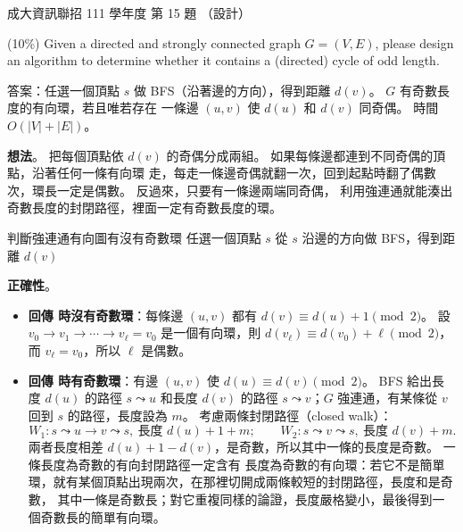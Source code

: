 \begin{pastexam}[label={px:ncku-111-prog-15}]{成大資訊聯招 111 學年度 第 15 題}
（設計）

(10\%) Given a directed and strongly connected graph $G=(V,E)$, please design an algorithm to determine whether it contains a (directed) cycle of odd length.
\end{pastexam}

\begin{pastsoln}
答案：任選一個頂點 $s$ 做 BFS（沿著邊的方向），得到距離 $d(v)$。 $G$ 有奇數長度的有向環，若且唯若存在
一條邊 $(u, v)$ 使 $d(u)$ 和 $d(v)$ 同奇偶。 時間 $O(|V| + |E|)$。

\textbf{想法}。 把每個頂點依 $d(v)$ 的奇偶分成兩組。 如果每條邊都連到不同奇偶的頂點，沿著任何一條有向環
走，每走一條邊奇偶就翻一次，回到起點時翻了偶數次，環長一定是偶數。 反過來，只要有一條邊兩端同奇偶，
利用強連通就能湊出奇數長度的封閉路徑，裡面一定有奇數長度的環。

\begin{pseudo}{判斷強連通有向圖有沒有奇數環}
    \State 任選一個頂點 $s$
    \State 從 $s$ 沿邊的方向做 BFS，得到距離 $d(v)$ 
            \State \Return \TRUE
        \EndIf
    \EndFor
    \State \Return \FALSE
\EndFunction
\end{pseudo}

\textbf{正確性}。
\begin{itemize}
\item \textbf{回傳 \FALSE 時沒有奇數環}：每條邊 $(u, v)$ 都有 $d(v) \equiv d(u) + 1 \pmod 2$。 設
$v_0 \to v_1 \to \cdots \to v_{\ell} = v_0$ 是一個有向環，則 $d(v_\ell) \equiv d(v_0) + \ell \pmod 2$，而
$v_\ell = v_0$，所以 $\ell$ 是偶數。
\item \textbf{回傳 \TRUE 時有奇數環}：有邊 $(u, v)$ 使 $d(u) \equiv d(v) \pmod 2$。 BFS 給出長度 $d(u)$ 的路徑
$s \leadsto u$ 和長度 $d(v)$ 的路徑 $s \leadsto v$；$G$ 強連通，有某條從 $v$ 回到 $s$ 的路徑，長度設為 $m$。
考慮兩條封閉路徑（closed walk）：
\[
W_1 : s \leadsto u \to v \leadsto s,\ \text{長度 } d(u) + 1 + m; \qquad
W_2 : s \leadsto v \leadsto s,\ \text{長度 } d(v) + m .
\]
兩者長度相差 $d(u) + 1 - d(v)$，是奇數，所以其中一條的長度是奇數。 一條長度為奇數的有向封閉路徑一定含有
長度為奇數的有向環：若它不是簡單環，就有某個頂點出現兩次，在那裡切開成兩條較短的封閉路徑，長度和是奇數，
其中一條是奇數長；對它重複同樣的論證，長度嚴格變小，最後得到一個奇數長的簡單有向環。
\end{itemize}


\end{pastsoln}
